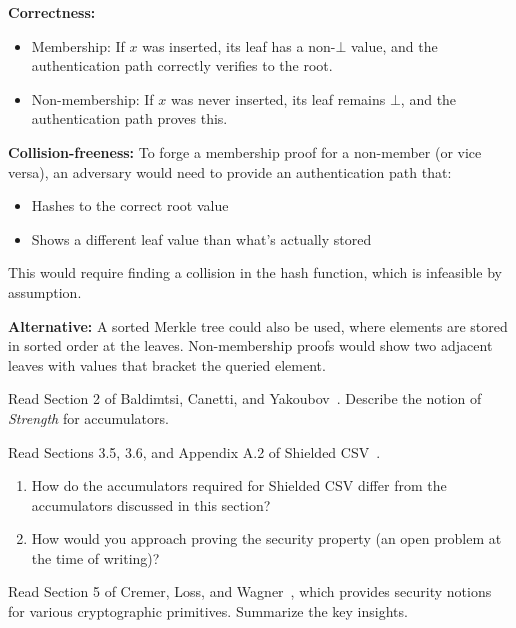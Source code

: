 \begin{mysolution}
  \textbf{Correctness:} 
  \begin{itemize}
    \item Membership: If $x$ was inserted, its leaf has a non-$\bot$ value, and the authentication path correctly verifies to the root.
    \item Non-membership: If $x$ was never inserted, its leaf remains $\bot$, and the authentication path proves this.
  \end{itemize}
  
  \textbf{Collision-freeness:} To forge a membership proof for a non-member (or vice versa), an adversary would need to provide an authentication path that:
  \begin{itemize}
    \item Hashes to the correct root value
    \item Shows a different leaf value than what's actually stored
  \end{itemize}
  This would require finding a collision in the hash function, which is infeasible by assumption.
  
  \textbf{Alternative:} A sorted Merkle tree could also be used, where elements are stored in sorted order at the leaves.
  Non-membership proofs would show two adjacent leaves with values that bracket the queried element.
\end{mysolution}
\fi

\begin{exercise}[Optional]
  Read Section 2 of Baldimtsi, Canetti, and Yakoubov~\cite{RSA:BalCanYak20}.
  Describe the notion of \emph{Strength} for accumulators.
\end{exercise}

\begin{exercise}[Optional]
  Read Sections 3.5, 3.6, and Appendix A.2 of Shielded CSV~\cite{nick2025shielded}.
  \begin{enumerate}
    \item How do the accumulators required for Shielded CSV differ from the accumulators discussed in this section?
    \item How would you approach proving the  security property (an open problem at the time of writing)?
  \end{enumerate}
\end{exercise}

\begin{exercise}[Optional]
  Read Section 5 of Cremer, Loss, and Wagner~\cite{EC:CreLosWag24}, which provides security notions for various cryptographic primitives.
  Summarize the key insights.
\end{exercise}


